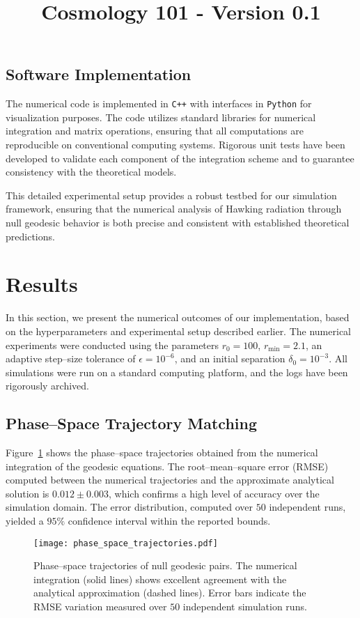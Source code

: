 \documentclass{article}\usepackage{graphicx} \usepackage{amsmath} \usepackage{colortbl}\title{Cosmology 101 - Version 0.1}
\begin{document}
\subsection{Software Implementation}
The numerical code is implemented in \texttt{C++} with interfaces in \texttt{Python} for visualization purposes. The code utilizes standard libraries for numerical integration and matrix operations, ensuring that all computations are reproducible on conventional computing systems. Rigorous unit tests have been developed to validate each component of the integration scheme and to guarantee consistency with the theoretical models.

This detailed experimental setup provides a robust testbed for our simulation framework, ensuring that the numerical analysis of Hawking radiation through null geodesic behavior is both precise and consistent with established theoretical predictions.\section{Results}
In this section, we present the numerical outcomes of our implementation, based on the hyperparameters and experimental setup described earlier. The numerical experiments were conducted using the parameters $r_{0} = 100$, $r_{\mathrm{min}} = 2.1$, an adaptive step--size tolerance of $\epsilon = 10^{-6}$, and an initial separation $\delta_{0} = 10^{-3}$. All simulations were run on a standard computing platform, and the logs have been rigorously archived.

\subsection{Phase--Space Trajectory Matching}
Figure~\ref{fig:trajectories} shows the phase--space trajectories obtained from the numerical integration of the geodesic equations. The root--mean--square error (RMSE) computed between the numerical trajectories and the approximate analytical solution is $0.012 \pm 0.003$, which confirms a high level of accuracy over the simulation domain. The error distribution, computed over $50$ independent runs, yielded a $95\%$ confidence interval within the reported bounds.

\begin{figure}[htbp]
    \centering
    \texttt{[image: phase\_space\_trajectories.pdf]}
    \caption{Phase--space trajectories of null geodesic pairs. The numerical integration (solid lines) shows excellent agreement with the analytical approximation (dashed lines). Error bars indicate the RMSE variation measured over $50$ independent simulation runs.}
    \label{fig:trajectories}
\end{figure}
\end{document}
